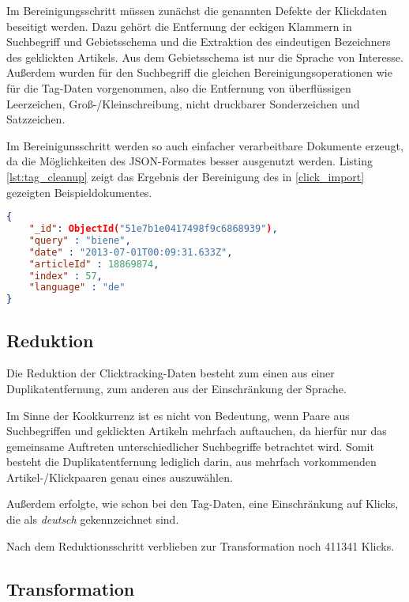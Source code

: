Im Bereinigungsschritt müssen zunächst die genannten Defekte der Klickdaten beseitigt werden. Dazu gehört die Entfernung der eckigen Klammern in Suchbegriff und Gebietsschema und die Extraktion des eindeutigen Bezeichners des geklickten Artikels. Aus dem Gebietsschema ist nur die Sprache von Interesse. Außerdem wurden für den Suchbegriff die gleichen Bereinigungsoperationen wie für die Tag-Daten vorgenommen, also die Entfernung von überflüssigen Leerzeichen, Groß-/Kleinschreibung, nicht druckbarer Sonderzeichen und Satzzeichen.

Im Bereinigunsschritt werden so auch einfacher verarbeitbare Dokumente erzeugt, da die Möglichkeiten des JSON-Formates besser ausgenutzt werden. Listing \ref{lst:tag_cleanup} zeigt das Ergebnis der Bereinigung des in \ref{click_import} gezeigten Beispieldokumentes.

\begin{lstlisting}[language=json, label={lst:tag_cleanup}, caption={Bereinigtes Clicktracking-Dokument}]
{
    "_id": ObjectId("51e7b1e0417498f9c6868939"),
    "query" : "biene",
    "date" : "2013-07-01T00:09:31.633Z",
    "articleId" : 18869874,
    "index" : 57,
    "language" : "de"
}
\end{lstlisting}

\subsection{Reduktion}

Die Reduktion der Clicktracking-Daten besteht zum einen aus einer Duplikatentfernung, zum anderen aus der Einschränkung der Sprache.

Im Sinne der Kookkurrenz ist es nicht von Bedeutung, wenn Paare aus Suchbegriffen und geklickten Artikeln mehrfach auftauchen, da hierfür nur das gemeinsame Auftreten unterschiedlicher Suchbegriffe betrachtet wird. Somit besteht die Duplikatentfernung lediglich darin, aus mehrfach vorkommenden Artikel-/Klickpaaren genau eines auszuwählen.

Außerdem erfolgte, wie schon bei den Tag-Daten, eine Einschränkung auf Klicks, die als \emph{deutsch} gekennzeichnet sind.

Nach dem Reduktionsschritt verblieben zur Transformation noch \num{411341} Klicks.

\subsection{Transformation}

